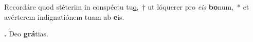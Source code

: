 
Recordáre quod stéterim in conspéctu tu\underline{o},~† ut lóquerer pro \textit{eis} \textbf{bo}num,~* et avérterem indignatiónem tuam ab \textbf{e}is.

\textbf{\Rbar.} Deo \textbf{grá}tias.

